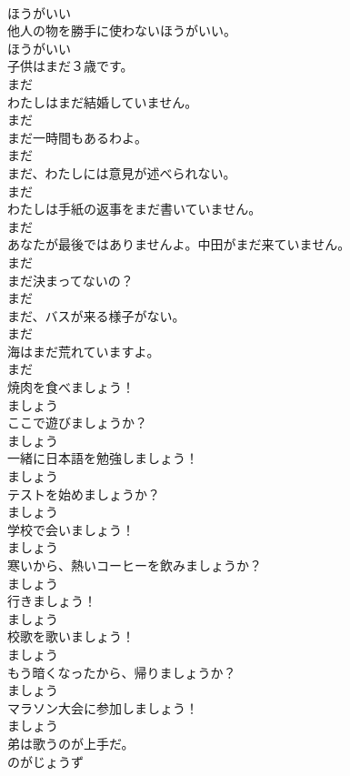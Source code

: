 \documentclass[8pt]{extreport}
\begin{document}
\begin{CJK}{UTF8}{min}
\\	ほうがいい
\\	他人の物を勝手に使わないほうがいい。	
\\	ほうがいい
\\	子供はまだ３歳です。	
\\	まだ
\\	わたしはまだ結婚していません。	
\\	まだ
\\	まだ一時間もあるわよ。	
\\	まだ
\\	まだ、わたしには意見が述べられない。	
\\	まだ
\\	わたしは手紙の返事をまだ書いていません。	
\\	まだ
\\	あなたが最後ではありませんよ。中田がまだ来ていません。	
\\	まだ
\\	まだ決まってないの？	
\\	まだ
\\	まだ、バスが来る様子がない。	
\\	まだ
\\	海はまだ荒れていますよ。	
\\	まだ
\\	焼肉を食べましょう！	
\\	ましょう
\\	ここで遊びましょうか？	
\\	ましょう
\\	一緒に日本語を勉強しましょう！	
\\	ましょう
\\	テストを始めましょうか？	
\\	ましょう
\\	学校で会いましょう！	
\\	ましょう
\\	寒いから、熱いコーヒーを飲みましょうか？	
\\	ましょう
\\	行きましょう！	
\\	ましょう
\\	校歌を歌いましょう！	
\\	ましょう
\\	もう暗くなったから、帰りましょうか？	
\\	ましょう
\\	マラソン大会に参加しましょう！	
\\	ましょう
\\	弟は歌うのが上手だ。	
\\	のがじょうず

\end{CJK}
\end{document}
